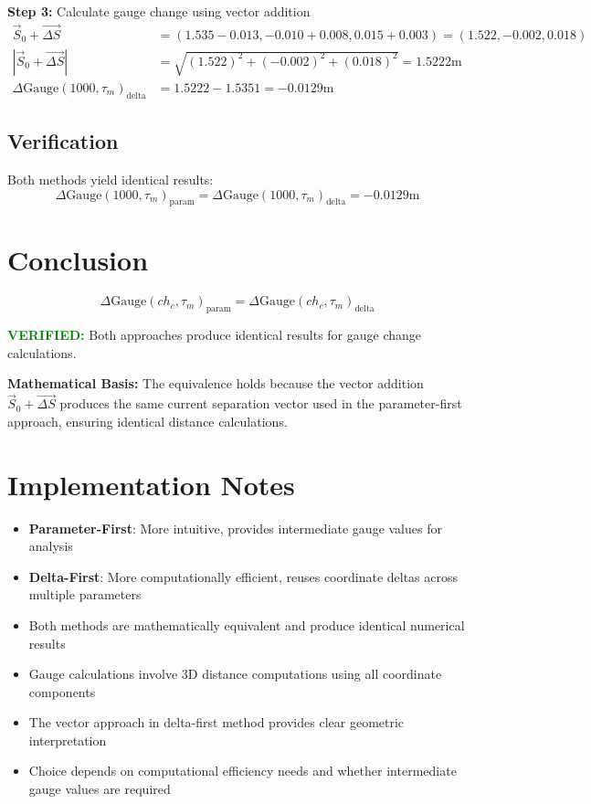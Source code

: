 \documentclass{article}
\begin{document}
\textbf{Step 3:} Calculate gauge change using vector addition
\begin{align}
\vec{S}_0 + \vec{\Delta S} &= (1.535 - 0.013, -0.010 + 0.008, 0.015 + 0.003) = (1.522, -0.002, 0.018) \\
|\vec{S}_0 + \vec{\Delta S}| &= \sqrt{(1.522)^2 + (-0.002)^2 + (0.018)^2} = 1.5222\text{m} \\
\Delta\text{Gauge}(1000, \tau_m)_{\text{delta}} &= 1.5222 - 1.5351 = -0.0129\text{m}
\end{align}

\subsection{Verification}
Both methods yield identical results:
\begin{equation}
\Delta\text{Gauge}(1000, \tau_m)_{\text{param}} = \Delta\text{Gauge}(1000, \tau_m)_{\text{delta}} = -0.0129\text{m}
\end{equation}

\section{Conclusion}
\begin{equation}
\boxed{\Delta\text{Gauge}(ch_c, \tau_m)_{\text{param}} = \Delta\text{Gauge}(ch_c, \tau_m)_{\text{delta}}}
\end{equation}

\textcolor{green}{\textbf{VERIFIED:}} Both approaches produce identical results for gauge change calculations.

\textbf{Mathematical Basis:} The equivalence holds because the vector addition $\vec{S}_0 + \vec{\Delta S}$ produces the same current separation vector used in the parameter-first approach, ensuring identical distance calculations.

\section{Implementation Notes}
\begin{itemize}
\item \textbf{Parameter-First}: More intuitive, provides intermediate gauge values for analysis
\item \textbf{Delta-First}: More computationally efficient, reuses coordinate deltas across multiple parameters
\item Both methods are mathematically equivalent and produce identical numerical results
\item Gauge calculations involve 3D distance computations using all coordinate components
\item The vector approach in delta-first method provides clear geometric interpretation
\item Choice depends on computational efficiency needs and whether intermediate gauge values are required
\end{itemize}
\end{document}
